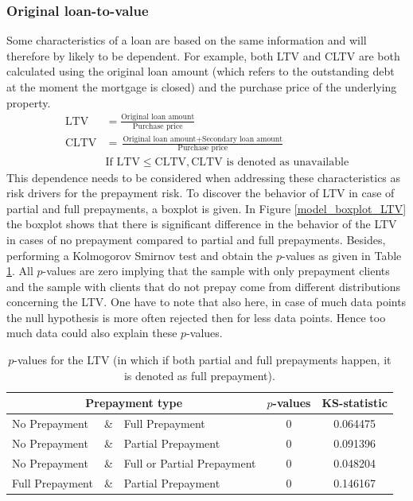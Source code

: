    \subsubsection{Original loan-to-value}\label{orig_ltv}
        Some characteristics of a loan are based on the same information
        and will therefore by likely to be dependent. 
        For example, both LTV and CLTV 
        are both calculated using the original loan amount
        (which refers to the outstanding debt at the moment the 
        mortgage is closed) and the purchase price of the underlying 
        property. 
        \begin{align}
            \text{LTV}&=
            \frac{\text{Original loan amount}}{\text{Purchase price}}\\
            \text{CLTV}&=
            \frac{\text{Original loan amount}+\text{Secondary loan amount}}{\text{Purchase price}}\\
            &\text{If } \text{LTV} \leq \text{CLTV}, \text{CLTV} \text{ is denoted as unavailable}
        \end{align}
        This dependence needs to be considered when addressing these 
        characteristics as risk drivers for the prepayment risk. 
        To discover the behavior of LTV in case of partial and full 
        prepayments, a boxplot is given. In Figure 
        \ref{model_boxplot_LTV} the boxplot shows that there is 
        significant difference in the behavior of the LTV in cases of 
        no prepayment compared to partial and full prepayments. Besides, 
        performing a Kolmogorov Smirnov test and obtain the $p$-values as 
        given in Table \ref{model_Pvals_of_LTV}. All $p$-values are zero 
        implying that the sample with only prepayment clients and the sample 
        with clients that do not prepay come from different distributions 
        concerning the LTV. One have to note that also here, 
        in case of much data points the null hypothesis is more often 
        rejected then for less data points. 
        Hence too much data could also explain these $p$-values.  
        \begin{table}[H]
        \centering
            \begin{tabular}{lcl|c|c}
                \multicolumn{3}{c|}{Prepayment type} 
                & $p$-values& KS-statistic \\\hline
                No Prepayment & \& & Full Prepayment & 0 & 0.064475\\
                No Prepayment & \& & Partial Prepayment & 0 & 0.091396\\
                No Prepayment & \& & Full or Partial Prepayment & 0 & 0.048204 \\
                Full Prepayment & \& & Partial Prepayment & 0 & 0.146167
		    \end{tabular}
            \caption{
                $p$-values for the LTV (in which if both partial and full 
                prepayments happen, it is denoted as full prepayment).
                }
	        \label{model_Pvals_of_LTV}
        \end{table}
    
